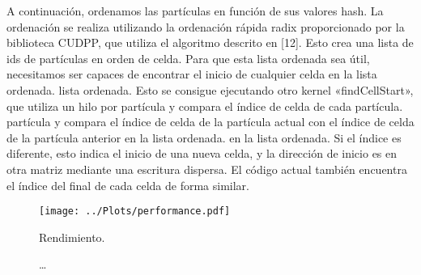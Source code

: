 A continuación, ordenamos las partículas en función de sus valores hash. La ordenación se realiza utilizando la ordenación rápida radix
proporcionado por la biblioteca CUDPP, que utiliza el algoritmo descrito en [12]. Esto crea una lista de
ids de partículas en orden de celda.
Para que esta lista ordenada sea útil, necesitamos ser capaces de encontrar el inicio de cualquier celda en la lista ordenada.
lista ordenada. Esto se consigue ejecutando otro kernel «findCellStart», que utiliza un hilo por partícula y compara el índice de celda de cada partícula.
partícula y compara el índice de celda de la partícula actual con el índice de celda de la partícula anterior en la lista ordenada.
en la lista ordenada. Si el índice es diferente, esto indica el inicio de una nueva celda, y la dirección de inicio es
en otra matriz mediante una escritura dispersa. El código actual también encuentra el índice del final de
cada celda de forma similar.

\begin{figure}
    \centering
    \texttt{[image: ../Plots/performance.pdf]}
    \caption{Rendimiento.}
    \label{fig:performance}
\end{figure}


\begin{figure}
    \centering
    \caption{\dots}
    \label{fig:grid-diagram}
\end{figure}
